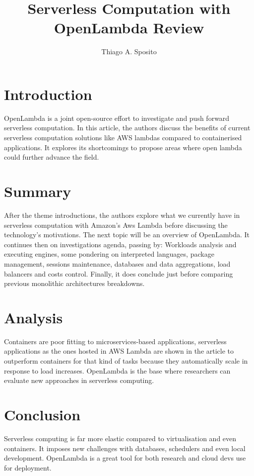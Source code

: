 \documentclass[12pt]{article}
\title{Serverless Computation with OpenLambda Review}
\author{Thiago A. Sposito\inst{1} }
\begin{document}
 

\maketitle


\section{Introduction}
OpenLambda is a joint open-source effort to investigate and push forward serverless computation. In this article, \cite{hendrickson2016serverless} the authors discuss the benefits of current serverless computation solutions like AWS lambdas compared to containerised applications. It explores its shortcomings to propose areas where open lambda could further advance the field.
\section{Summary}
After the theme introductions, the authors explore what we currently have in serverless computation with Amazon's Aws Lambda before discussing the technology's motivations. The next topic will be an overview of OpenLambda. It continues then on investigations agenda, passing by: Workloads analysis and executing engines, some pondering on interpreted languages, package management, sessions maintenance, databases and data aggregations, load balancers and costs control. Finally, it does conclude just before comparing previous monolithic architectures breakdowns.
\section{Analysis}
Containers are poor fitting to microservices-based applications, serverless applications as the ones hosted in AWS Lambda are shown in the article to outperform containers for that kind of tasks because they automatically scale in response to load increases. OpenLambda is the base where researchers can evaluate new approaches in serverless computing.
\section{Conclusion}
Serverless computing is far more elastic compared to virtualisation and even containers. It imposes new challenges with databases, schedulers and even local development. OpenLambda is a great tool for both research and cloud devs use for deployment.


\end{document}
